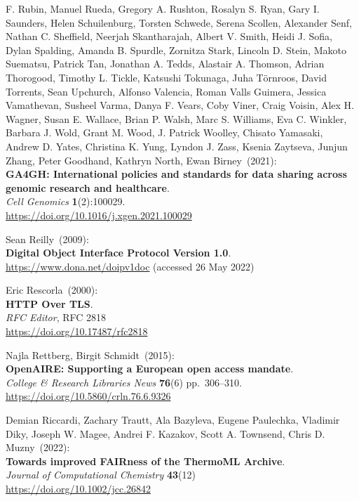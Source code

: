 \begin{thebibliography}{9}
F. Rubin, Manuel Rueda, Gregory A. Rushton, Rosalyn S. Ryan, Gary I.
Saunders, Helen Schuilenburg, Torsten Schwede, Serena Scollen, Alexander
Senf, Nathan C. Sheffield, Neerjah Skantharajah, Albert V. Smith, Heidi
J. Sofia, Dylan Spalding, Amanda B. Spurdle, Zornitza Stark, Lincoln D.
Stein, Makoto Suematsu, Patrick Tan, Jonathan A. Tedds, Alastair A.
Thomson, Adrian Thorogood, Timothy L. Tickle, Katsushi Tokunaga, Juha
Törnroos, David Torrents, Sean Upchurch, Alfonso Valencia, Roman Valls
Guimera, Jessica Vamathevan, Susheel Varma, Danya F. Vears, Coby Viner,
Craig Voisin, Alex H. Wagner, Susan E. Wallace, Brian P. Walsh, Marc S.
Williams, Eva C. Winkler, Barbara J. Wold, Grant M. Wood, J. Patrick
Woolley, Chisato Yamasaki, Andrew D. Yates, Christina K. Yung, Lyndon J.
Zass, Ksenia Zaytseva, Junjun Zhang, Peter Goodhand, Kathryn North, Ewan
Birney~(2021): \\
\textbf{GA4GH: International policies and standards for data sharing
across genomic research and healthcare}.\\
\emph{Cell Genomics} \textbf{1}(2):100029.\\
\url{https://doi.org/10.1016/j.xgen.2021.100029}


Sean Reilly~(2009): \\
\textbf{Digital Object Interface Protocol Version 1.0}.\\
\url{https://www.dona.net/doipv1doc} (accessed 26 May 2022)

Eric Rescorla~(2000): \\
\textbf{HTTP Over TLS}.\\
\emph{RFC Editor}, RFC 2818\\
\url{https://doi.org/10.17487/rfc2818}

Najla Rettberg, Birgit Schmidt~(2015): \\
\textbf{OpenAIRE: Supporting a European open access mandate}.\\
\emph{College \& Research Libraries News} \textbf{76}(6) pp.~306--310.\\
\url{https://doi.org/10.5860/crln.76.6.9326}

Demian Riccardi, Zachary Trautt, Ala Bazyleva, Eugene Paulechka, Vladimir Diky, Joseph W. Magee, Andrei F. Kazakov, Scott A. Townsend, Chris D. Muzny~(2022): \\
\textbf{Towards improved {FAIRness} of the {ThermoML} Archive}.\\
\emph{Journal of Computational Chemistry} \textbf{43}(12)\\
\url{https://doi.org/10.1002/jcc.26842}



\end{thebibliography}
